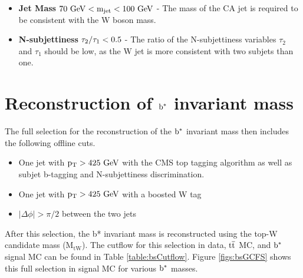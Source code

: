 \begin{itemize}
\item {\bf Jet Mass}  $\mathrm{\boldmath 70~\mathrm{GeV} < m_{\text{jet}} < 100~\mathrm{GeV}}$ - The mass of the CA jet is required to be consistent with the W boson mass. 
\item {\bf N-subjettiness} $\mathrm{\boldmath \tau_{2}/\tau_{1} < 0.5}$  - The ratio of the N-subjettiness variables $\tau_{2}$ and $\tau_{1}$ should be low, as the W jet is more consistent with two subjets than one.
\end{itemize}

\section{Reconstruction of $\mathrm{b}^{*}$ invariant mass}
\label{sec:bsfullselection}
The full selection for the reconstruction of the $\mathrm{b}^{*}$ invariant mass then includes the following offline cuts.
\begin{itemize}
\item One jet with $\mathrm{p_{T}} > 425~\mathrm{GeV}$ with the CMS top tagging algorithm as well as subjet b-tagging and N-subjettiness discrimination.
\item One jet with $\mathrm{p_{T}} > 425~\mathrm{GeV}$ with a boosted W tag
\item $|\Delta \phi| > \pi/2$ between the two jets
\end{itemize}
After this selection, the b* invariant mass is reconstructed using the top-W candidate mass ($\mathrm{M_{tW}}$).
The cutflow for this selection in data, $\mathrm{t\overline{t}}$ MC, and $\mathrm{b}^{*}$ signal MC can be found in Table \ref{table:bsCutflow}.
Figure \ref{figs:bsGCFS} shows this full selection in signal MC for various $\mathrm{b}^{*}$ masses.  



